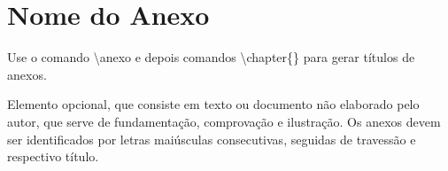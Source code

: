 \anexo
\chapter{Nome do Anexo}
\label{chap:anexo}

Use o comando {\ttfamily \textbackslash anexo} e depois comandos {\ttfamily \textbackslash chapter\{\}}
para gerar t\'itulos de anexos.

Elemento opcional, que consiste em texto ou documento não elaborado pelo autor, que serve de fundamentação, comprovação e ilustração.
Os anexos devem ser identificados por letras maiúsculas consecutivas, seguidas de travessão e respectivo título.
